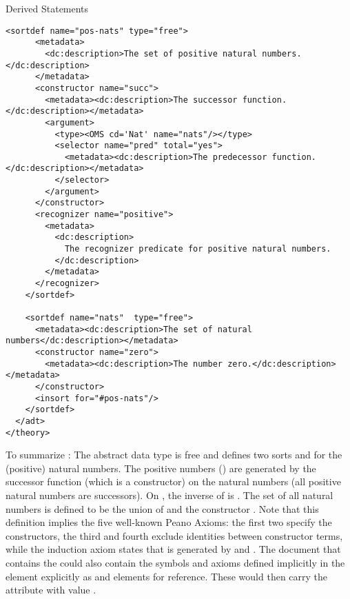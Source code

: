 \begin{omgroup}{Derived Statements}
\begin{module}[id=adt]
\begin{omgroup}[id=adt,short=Abstract Data Types]
\begin{module}[id=adt]
\begin{lstlisting}[label=lst:nat-adt,
  caption={The natural numbers using {\element{adt}} in {\omdoc}},
  index={adt,sortdef,constructor,argument,selector,recognizer,insort}]
    <sortdef name="pos-nats" type="free">
      <metadata>
        <dc:description>The set of positive natural numbers.</dc:description>
      </metadata>
      <constructor name="succ">
        <metadata><dc:description>The successor function.</dc:description></metadata>
        <argument>
          <type><OMS cd='Nat' name="nats"/></type>
          <selector name="pred" total="yes">
            <metadata><dc:description>The predecessor function.</dc:description></metadata>
          </selector>
        </argument>
      </constructor>
      <recognizer name="positive">
        <metadata>
          <dc:description>
            The recognizer predicate for positive natural numbers.
          </dc:description>
        </metadata>
      </recognizer>
    </sortdef>

    <sortdef name="nats"  type="free">
      <metadata><dc:description>The set of natural numbers</dc:description></metadata>
      <constructor name="zero">
        <metadata><dc:description>The number zero.</dc:description></metadata>
      </constructor>
      <insort for="#pos-nats"/>
    </sortdef>
  </adt>
</theory>
\end{lstlisting}
To summarize {}: The abstract data type {} is free and
defines two sorts {} and {} for the (positive) natural
numbers. The positive numbers ({}) are generated by the successor
function (which is a constructor) on the natural numbers (all positive natural numbers are
successors). On {}, the inverse {} of {} is
{}.  The set {} of all natural numbers is defined to be the
union of {} and the constructor {}.  Note that this
definition implies the five well-known Peano Axioms: the first two specify the
constructors, the third and fourth exclude identities between constructor terms, while the
induction axiom states that {} is generated by {} and
{}.  The document that contains the {} could also contain
the symbols and axioms defined implicitly in the {} element explicitly as
{} and {} elements for reference.  These would then carry
the {} attribute with value
{}.
\end{module}
\end{omgroup}
\end{module}


\end{omgroup}
